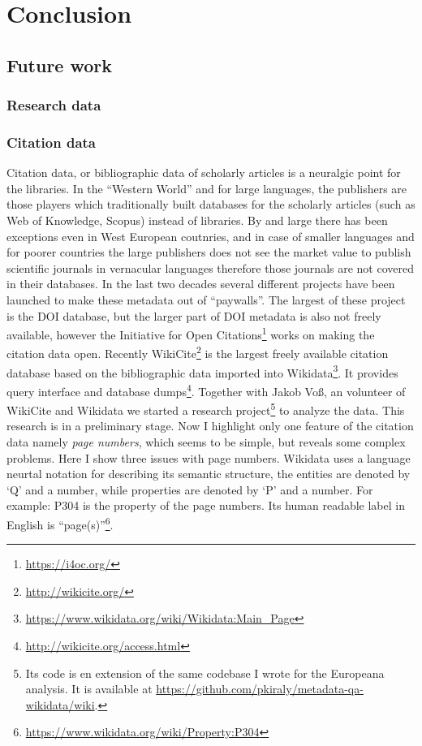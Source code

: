 \chapter{Conclusion}

\section{Future work}

\subsection{Research data}

\subsection{Citation data}

Citation data, or bibliographic data of scholarly articles is a neuralgic point for the libraries. In the ``Western World'' and for large languages, the publishers are those players which traditionally built databases for the scholarly articles (such as Web of Knowledge, Scopus) instead of libraries. By and large there has been exceptions even in West European coutnries, and in case of smaller languages and for poorer countries the large publishers does not see the market value to publish scientific journals in vernacular languages therefore those journals are not covered in their databases. In the last two decades several different projects have been launched to make these metadata out of ``paywalls''. The largest of these project is the DOI database, but the larger part of DOI metadata is also not freely available, however the Initiative for Open Citations\footnote{\url{https://i4oc.org/}} works on making the citation data open. Recently WikiCite\footnote{\url{http://wikicite.org/}} is the largest freely available citation database based on the bibliographic data imported into Wikidata\footnote{\url{https://www.wikidata.org/wiki/Wikidata:Main_Page}}. It provides query interface and database dumps\footnote{\url{http://wikicite.org/access.html}}. Together with Jakob Voß, an volunteer of WikiCite and Wikidata we started a research project\footnote{Its code is en extension of the same codebase I wrote for the Europeana analysis. It is available at \url{https://github.com/pkiraly/metadata-qa-wikidata/wiki}.} to analyze the data. This research is in a preliminary stage. Now I highlight only one feature of the citation data namely \emph{page numbers}, which seems to be simple, but reveals some complex problems. Here I show three issues with page numbers. Wikidata uses a language neurtal notation for describing its semantic structure, the entities are denoted by `Q' and a number, while properties are denoted by `P' and a number. For example: P304 is the property of the page numbers. Its human readable label in English is ``page(s)''\footnote{\url{https://www.wikidata.org/wiki/Property:P304}}.

